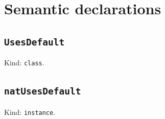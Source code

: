 \documentclass[11pt]{article}
\begin{document}
\section*{Semantic declarations}
\subsection*{\texttt{UsesDefault}}
\noindent Kind: \texttt{class}.\par
\subsection*{\texttt{natUsesDefault}}
\noindent Kind: \texttt{instance}.\par
\end{document}
